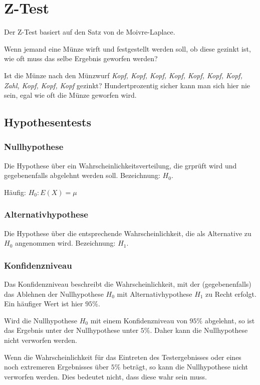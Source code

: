 \chapter{Z-Test}

Der Z-Test basiert auf den Satz von de Moivre-Laplace.

Wenn jemand eine Münze wirft und festgestellt werden soll, ob diese gezinkt
ist, wie oft muss das selbe Ergebnis geworfen werden?

Ist die Münze nach den Münzwurf \textit{Kopf, Kopf, Kopf, Kopf, Kopf, Kopf,
    Kopf, Zahl, Kopf, Kopf, Kopf} gezinkt? Hundertprozentig sicher kann man sich
hier nie sein, egal wie oft die Münze geworfen wird.

\section{Hypothesentests}

\subsection{Nullhypothese}

Die Hypothese über ein Wahrscheinlichkeitsverteilung, die grprüft wird und
gegebenenfalls abgelehnt werden soll. Bezeichnung: $H_0$.

Häufig: $H_0: E(X) = \mu$

\subsection{Alternativhypothese}

Die Hypothese über die entsprechende Wahrscheinlichkeit, die als Alternative zu
$H_0$ angenommen wird. Bezeichnung: $H_1$.

\subsection{Konfidenzniveau}

Das Konfidenzniveau beschreibt die Wahrscheinlichkeit, mit der (gegebenenfalls)
das Ablehnen der Nullhypothese $H_0$ mit Alternativhypothese $H_1$ zu Recht
erfolgt. Ein häufiger Wert ist hier $95\%$.

Wird die Nullhypothese $H_0$ mit einem Konfidenzniveau von $95\%$ abgelehnt, so
ist das Ergebnis unter der Nullhypothese unter $5\%$. Daher kann die
Nullhypothese nicht verworfen werden.

Wenn die Wahrscheinlichkeit für das Eintreten des Testergebnisses oder eines
noch extremeren Ergebnisses über $5\%$ beträgt, so kann die Nullhypothese nicht
verworfen werden. Dies bedeutet nicht, dass diese wahr sein muss.

